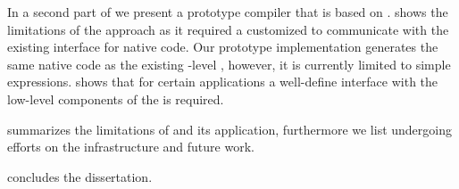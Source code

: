 \begin{description}
	In a second part of  we present \NBJ a prototype \JIT compiler that is based on \B.
	\NBJ shows the limitations of the \B approach as it required a customized \VM to communicate with the existing \JIT interface for native code.
	Our prototype implementation generates the same native code as the existing \VM-level \JIT, however, it is currently limited to simple expressions.
	\NBJ shows that for certain applications a well-define interface with the low-level components of the \VM is required.

\item[\chapref{future}] summarizes the limitations of \B and its application, furthermore we list undergoing efforts on the \B infrastructure and future work.

\item[\chapref{conclusion}] concludes the dissertation.

\end{description}


